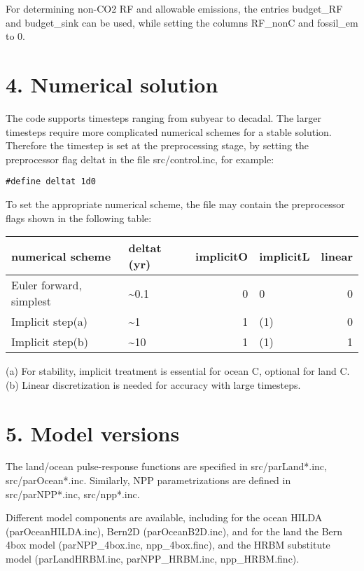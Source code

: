 \documentclass[11pt]{article}
\begin{document}
For determining non-CO2 RF and allowable emissions, the entries budget\_RF and budget\_sink can be used, while setting the columns RF\_nonC and fossil\_em to 0.

\section*{4. Numerical solution}
\label{sec-5}

The code supports timesteps ranging from subyear to decadal. The larger timesteps require more complicated numerical schemes for a stable solution. Therefore the timestep is set at the preprocessing stage, by setting the preprocessor flag deltat in the file src/control.inc, for example:

\begin{verbatim}
#define deltat 1d0
\end{verbatim}

To set the appropriate numerical scheme, the file may contain the preprocessor flags shown in the following table:
\begin{center}
\begin{tabular}{llrlr}
numerical scheme & deltat (yr) & implicitO & implicitL & linear\\
\hline
Euler forward, simplest & \textasciitilde{}0.1 & 0 & 0 & 0\\
Implicit step(a) & \textasciitilde{}1 & 1 & (1) & 0\\
Implicit step(b) & \textasciitilde{}10 & 1 & (1) & 1\\
\end{tabular}
\end{center}

(a) For stability, implicit treatment is essential for ocean C, optional for land C.
(b) Linear discretization is needed for accuracy with large timesteps.


\section*{5. Model versions}
\label{sec-6}

The land/ocean pulse-response functions are specified in src/parLand*.inc, src/parOcean*.inc.
Similarly, NPP parametrizations are defined in src/parNPP*.inc, src/npp*.inc.

Different model components are available, including for the ocean HILDA (parOceanHILDA.inc), Bern2D (parOceanB2D.inc), and for the land the Bern 4box model (parNPP\_4box.inc, npp\_4box.finc), and the HRBM substitute model (parLandHRBM.inc, parNPP\_HRBM.inc, npp\_HRBM.finc).
\end{document}
